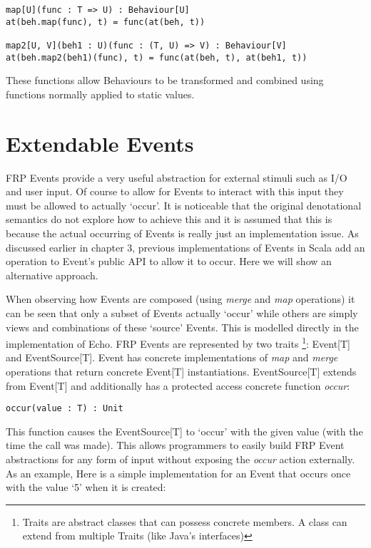 \begin{verbatim}
map[U](func : T => U) : Behaviour[U]
at(beh.map(func), t) = func(at(beh, t))

map2[U, V](beh1 : U)(func : (T, U) => V) : Behaviour[V]
at(beh.map2(beh1)(func), t) = func(at(beh, t), at(beh1, t))
\end{verbatim}        

    These functions allow Behaviours to be transformed and combined using functions
    normally applied to static values.
    
  \section{Extendable Events}
    FRP Events provide a very useful abstraction for external stimuli such as I/O and user input. Of course
    to allow for Events to interact with this input they must be allowed to actually `occur'.
    It is noticeable that the original denotational semantics \cite{Elliott1997} do not explore how to achieve
    this and it is assumed that this is because the actual occurring of Events is really just an implementation
    issue. As discussed earlier in chapter 3, previous implementations of Events in Scala add an operation to Event's
    public API to allow it to occur. Here we will show an alternative approach.
    
    When observing how Events are composed (using \emph{merge} and \emph{map} operations) it can be seen that
    only a subset of Events actually `occur' while others are simply views and combinations of these `source' Events.
    This is modelled directly in the implementation of Echo. FRP Events are represented by two traits \footnote{Traits are abstract
    classes that can possess concrete members. A class can extend from multiple Traits (like Java's interfaces)}: 
    Event[T] and EventSource[T].
    Event has concrete implementations of \emph{map} and \emph{merge} operations that
    return concrete Event[T] instantiations. EventSource[T] extends
    from Event[T] and additionally has a protected access concrete function \emph{occur}:
    
\begin{verbatim}
occur(value : T) : Unit
\end{verbatim}  

    This function causes the EventSource[T] to `occur' with the given value (with the time the call was made). This allows 
    programmers
    to easily build FRP Event abstractions for any form of input without exposing the \emph{occur} action externally.
    As an example, Here is a simple implementation for an Event that occurs once with the value `5' when it 
    is created:
    
